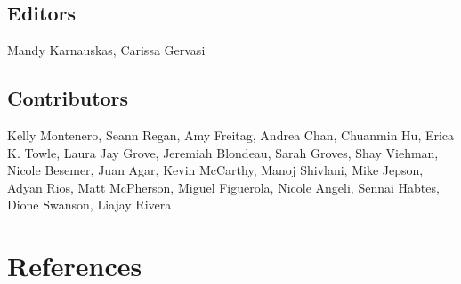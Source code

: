 \documentclass[
  letterpaper,
  oneside,
  open=any]{scrbook}
\newlength{\cslhangindent}
\newenvironment{CSLReferences}[2] %
 {\begin{list}{}{%
  \setlength{\itemindent}{0pt}
  \setlength{\leftmargin}{0pt}
  \setlength{\parsep}{0pt}
  \ifodd #1
   \setlength{\leftmargin}{\cslhangindent}
   \setlength{\itemindent}{-1\cslhangindent}
  \fi
  \setlength{\itemsep}{#2\baselineskip}}}
 {\end{list}}
\begin{document}
\section{\texorpdfstring{\textbf{Editors}}{Editors}}\label{editors}

Mandy Karnauskas, Carissa Gervasi

\section{\texorpdfstring{\textbf{Contributors}}{Contributors}}\label{contributors-1}

Kelly Montenero, Seann Regan, Amy Freitag, Andrea Chan, Chuanmin Hu,
Erica K. Towle, Laura Jay Grove, Jeremiah Blondeau, Sarah Groves, Shay
Viehman, Nicole Besemer, Juan Agar, Kevin McCarthy, Manoj Shivlani, Mike
Jepson, Adyan Rios, Matt McPherson, Miguel Figuerola, Nicole Angeli,
Sennai Habtes, Dione Swanson, Liajay Rivera


\chapter*{References}\label{references}


\label{refs}
\begin{CSLReferences}{0}{1}
\end{CSLReferences}


\backmatter
\end{document}
